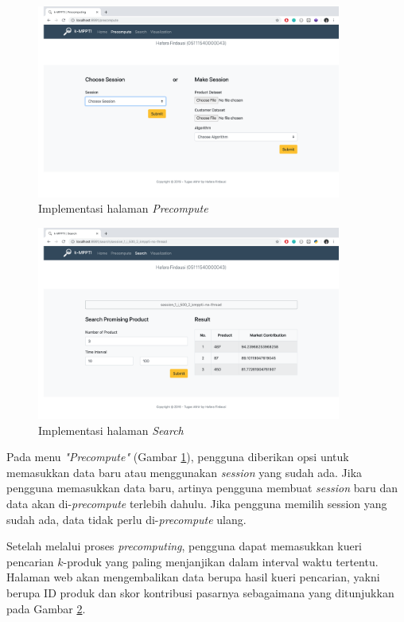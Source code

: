 \begin{figure}[H]
	\centering
	\includegraphics[width=10cm]{assets/img/bab4/precompute.png}
	\caption{Implementasi halaman \textit{Precompute}}
	\label{fig:precompute}
\end{figure}

\begin{figure}[H]
	\centering
	\includegraphics[width=10cm]{assets/img/bab4/search.png}
	\caption{Implementasi halaman \textit{Search}}
	\label{fig:search}
\end{figure}

Pada menu \textit{"Precompute"} (Gambar \ref{fig:precompute}), pengguna diberikan opsi untuk memasukkan data baru atau menggunakan \textit{session} yang sudah ada. Jika pengguna memasukkan data baru, artinya pengguna membuat \textit{session} baru dan data akan di-\textit{precompute} terlebih dahulu. Jika pengguna memilih session yang sudah ada, data tidak perlu di-\textit{precompute} ulang.

Setelah melalui proses \textit{precomputing}, pengguna dapat memasukkan kueri pencarian $k$-produk yang paling menjanjikan dalam interval waktu tertentu. Halaman web akan mengembalikan data berupa hasil kueri pencarian, yakni berupa ID produk dan skor kontribusi pasarnya sebagaimana yang ditunjukkan pada Gambar \ref{fig:search}.

